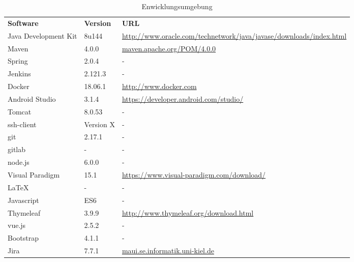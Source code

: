 \begin{table}[h]
	\centering
	\begin{tabularx}{\textwidth}{l l X}
		\rowcolor[HTML]{C0C0C0} 
		\textbf{Software} & \textbf{Version} & \textbf{URL} \\
		Java Development Kit & 8u144 & \url{http://www.oracle.com/technetwork/java/javase/downloads/index.html} \\
		\rowcolor[HTML]{E7E7E7} 
		Maven & 4.0.0 & \url{maven.apache.org/POM/4.0.0} \\
		Spring & 2.0.4 & - \\
		\rowcolor[HTML]{E7E7E7} 
		Jenkins & 2.121.3 & - \\
		Docker & 18.06.1 & \url{http://www.docker.com} \\
		\rowcolor[HTML]{E7E7E7} 
		Android Studio & 3.1.4 & \url{https://developer.android.com/studio/}\\
		Tomcat & 8.0.53 & - \\
		\rowcolor[HTML]{E7E7E7} 
		ssh-client & Version X & - \\
		git & 2.17.1 & - \\
		\rowcolor[HTML]{E7E7E7} 
		gitlab & - & - \\
		node.js & 6.0.0 & - \\
		\rowcolor[HTML]{E7E7E7} 
		Visual Paradigm & 15.1 & \url{https://www.visual-paradigm.com/download/}\\
		LaTeX & - & - \\
		\rowcolor[HTML]{E7E7E7} 
		Javascript & ES6 & -\\
		Thymeleaf & 3.9.9 & \url{http://www.thymeleaf.org/download.html} \\
		\rowcolor[HTML]{E7E7E7} 
		vue.js & 2.5.2 & - \\
		Bootstrap & 4.1.1 & -\\
		\rowcolor[HTML]{E7E7E7} 
		Jira & 7.7.1 & \url{maui.se.informatik.uni-kiel.de} \\
	\end{tabularx}
	\caption{Enwicklungsumgebung}
	\label{table:entwicklungsumgebung}
\end{table}